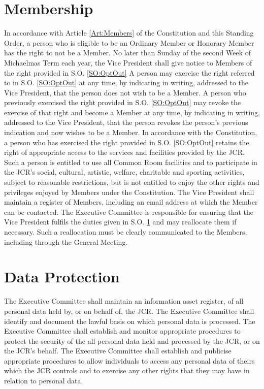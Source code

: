 \section{Membership} \label{SO:Membership}
\npara \label{SO:OptOut} In accordance with Article \ref{Art:Members} of the Constitution and this Standing Order, a person who is eligible to be an Ordinary Member or Honorary Member has the right to not be a Member.
\npara No later than Sunday of the second Week of Michaelmas Term each year, the Vice President shall give notice to Members of the right provided in S.O. \ref{SO:OptOut}
\npara A person may exercise the right referred to in S.O. \ref{SO:OptOut} at any time, by indicating in writing, addressed to the Vice President, that the person does not wish to be a Member.
\npara A person who previously exercised the right provided in S.O. \ref{SO:OptOut} may revoke the exercise of that right and become a Member at any time, by indicating in writing, addressed to the Vice President, that the person revokes the person's previous indication and now wishes to be a Member.
\npara In accordance with the Constitution, a person who has exercised the right provided in S.O. \ref{SO:OptOut} retains the right of appropriate access to the services and facilities provided by the JCR.
Such a person is entitled to use all Common Room facilities and to participate in the JCR's social, cultural, artistic, welfare, charitable and sporting activities, subject to reasonable restrictions, but is not entitled to enjoy the other rights and privileges enjoyed by Members under the Constitution.
\npara The Vice President shall maintain a register of Members, including an email address at which the Member can be contacted.
\npara The Executive Committee is responsible for ensuring that the Vice President fulfils the duties given in S.O. \ref{SO:Membership} and may reallocate them if necessary.
Such a reallocation must be clearly communicated to the Members, including through the General Meeting.
\section{Data Protection}
\npara The Executive Committee shall maintain an information asset register, of all personal data held by, or on behalf of, the JCR.  The Executive Committee shall identify and document the lawful basis on which personal data is processed.
\npara The Executive Committee shall establish and monitor appropriate procedures to protect the security of the all personal data held and processed by the JCR, or on the JCR's behalf.
\npara The Executive Committee shall establish and publicise appropriate procedures to allow individuals to access any personal data of theirs which the JCR controls and to exercise any other rights that they may have in relation to personal data.